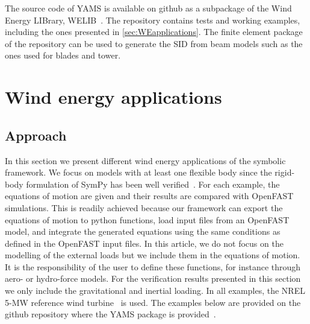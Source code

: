 \documentclass[wes, manuscript]{copernicus}
\newcommand{\m}[1]{\boldsymbol{#1}}
\begin{document}
The source code of YAMS is available on github as a subpackage of the Wind Energy LIBrary, WELIB~\citep{WELIBgithub}.
The repository contains tests and working examples, including the ones presented in \autoref{sec:WEapplications}.
The finite element package of the repository can be used to generate the SID from beam models such as the ones used for blades and tower.










\section{Wind energy applications}
\label{sec:WEapplications}

\subsection{Approach}
In this section we present different wind energy applications of the symbolic framework. 
We focus on models with at least one flexible body since the rigid-body formulation of SymPy has been well verified~\citep{Gede:2013}.
For each example, the equations of motion are given and their results are compared with OpenFAST~\citep{openfast} simulations.
This is readily achieved because our framework can export the equations of motion to python functions, load input files from an OpenFAST model, and integrate the generated equations using the same conditions as defined in the OpenFAST input files. 
In this article, we do not focus on the modelling of the external loads but we include them in the equations of motion.
It is the responsibility of the user to define these functions, for instance through aero- or hydro-force models.
For the verification results presented in this section we only include the gravitational and inertial loading.
In all examples, the NREL 5-MW reference wind turbine~\citep{nrel5mw} is used.
The examples below are provided on the github repository where the YAMS package is provided~\citep{WELIBgithub}.
\end{document}
